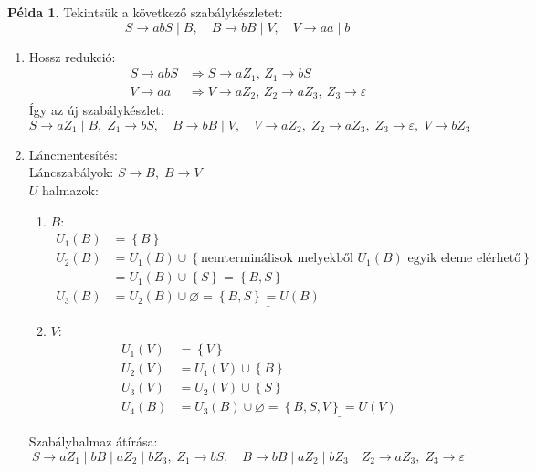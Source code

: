 \documentclass[a4paper,12pt]{article}
\theoremstyle{definition}
\newtheorem*{example}{Példa}
\begin{document}
	\begin{example}
		Tekintsük a következő szabálykészletet:
		\[
		S \rightarrow abS \mid B, \quad B \rightarrow bB \mid V, \quad V \rightarrow aa \mid b
		\]
		\begin{enumerate}
			\item Hossz redukció:
			\begin{align*}
				S \rightarrow abS &\Rightarrow S \rightarrow aZ_1, \, Z_1 \rightarrow bS \\
				V \rightarrow aa &\Rightarrow V \rightarrow aZ_2, \, Z_2 \rightarrow aZ_3, \ Z_3 \rightarrow \varepsilon 
			\end{align*}
			Így az új szabálykészlet:
			\[
			S \rightarrow aZ_1 \mid B, \;
			Z_1 \rightarrow bS, \quad
			B \rightarrow bB \mid V, \quad
			V \rightarrow aZ_2, \;
			Z_2 \rightarrow aZ_3, \;
			Z_3 \rightarrow \varepsilon, \;
			V \rightarrow bZ_3
			\]
			\item Láncmentesítés: \\
			Láncszabályok: $ S \rightarrow B, \; B \rightarrow V $ \\
			$U$ halmazok:
			\begin{enumerate}
				\item $B$:
				\begin{align*}
					U_1(B) &= \left\lbrace B \right\rbrace \\
					U_2(B) &= U_1(B) \cup \left\lbrace \text{nemterminálisok melyekből } U_1(B) \text{ egyik eleme elérhető} \right\rbrace \\
					&= U_1(B) \cup \left\lbrace S \right\rbrace = \left\lbrace B, S \right\rbrace \\
					U_3(B) &= U_2(B) \cup \varnothing = \underline{\left\lbrace B, S \right\rbrace = U(B)}
				\end{align*}
				\item $V$:
				\begin{align*}
					U_1(V) &= \left\lbrace V \right\rbrace \\
					U_2(V) &= U_1(V) \cup \left\lbrace B \right\rbrace \\
					U_3(V) &= U_2(V) \cup \left\lbrace S \right\rbrace \\
					U_4(B) &= U_3(B) \cup \varnothing = \underline{\left\lbrace B, S, V \right\rbrace = U(V)}
				\end{align*}
	
			\end{enumerate}
			Szabályhalmaz átírása:
			\[
				S \rightarrow aZ_1 \mid bB \mid aZ_2 \mid bZ_3,  \;
				Z_1 \rightarrow bS, \quad
				B \rightarrow bB \mid aZ_2 \mid bZ_3 \quad
				Z_2 \rightarrow aZ_3, \;
				Z_3 \rightarrow \varepsilon
			\]
		\end{enumerate}
	\end{example}
\end{document}
